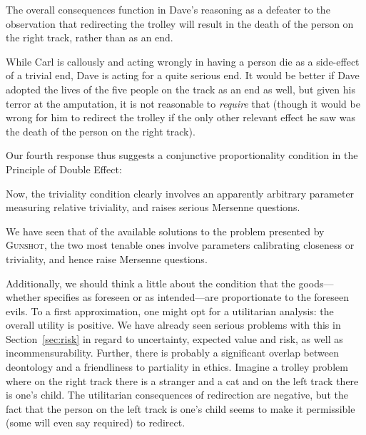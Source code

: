 The overall consequences function in Dave's reasoning as a defeater to the 
observation that redirecting the trolley will result in the death of the person on the right track, rather than as 
an end. 

While Carl is callously  and acting wrongly in having a person die as a side-effect of a trivial end, Dave is acting for a quite
serious end. It would be better if Dave adopted the lives of the five people on the track as an end as well, but given his
terror at the amputation, it is not reasonable to \textit{require} that (though it would be wrong for him to redirect the
trolley if the only other relevant effect he saw was the death of the person on the right track).

Our fourth response thus suggests a conjunctive proportionality condition in the Principle of Double Effect:

Now, the triviality condition clearly involves an apparently arbitrary parameter measuring relative triviality, and raises serious 
Mersenne questions. 

We have seen that of the available solutions to the problem presented by \textsc{Gunshot}, the two most tenable ones involve 
parameters calibrating closeness or triviality, and hence raise Mersenne questions.

Additionally, we should think a little about the condition that the goods---whether specifies as foreseen or as intended---are 
proportionate to the foreseen evils. To a first approximation, one might opt for a utilitarian analysis: the overall
utility is positive. We have already seen serious problems with this in Section~\ref{sec:risk} in regard to uncertainty, expected value
and risk, as well as incommensurability. Further, there is probably a significant overlap between deontology and a friendliness
to partiality in ethics. Imagine a trolley problem where on the right track there is a stranger and a cat and on the left track
there is one's child. The utilitarian consequences of redirection are negative, but the fact that the person on the left track
is one's child seems to make it permissible (some will even say required) to redirect. 

